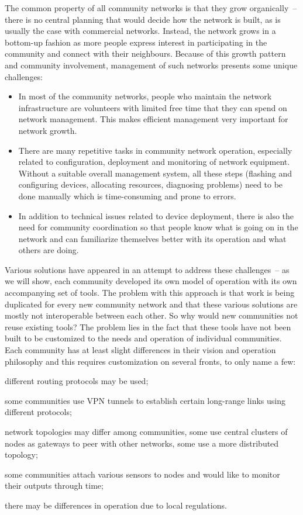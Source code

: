\documentclass[5p,sort&compress]{elsarticle}
\begin{document}
The common property of all community networks is that they grow organically~-- there is no central planning that would decide how the network is built, as is usually the case with commercial networks.
Instead, the network grows in a bottom-up fashion as more people express interest in participating in the community and connect with their neighbours.
Because of this growth pattern and community involvement, management of such networks presents some unique challenges:

\begin{itemize}
\item In most of the community networks, people who maintain the network infrastructure are volunteers with limited free time that they can spend on network management.
This makes efficient management very important for network growth.

\item There are many repetitive tasks in community network operation, especially related to configuration, deployment and monitoring of network equipment.
Without a suitable overall management system, all these steps (flashing and configuring devices, allocating resources, diagnosing problems) need to be done manually which is time-consuming and prone to errors.

\item In addition to technical issues related to device deployment, there is also the need for community coordination so that people know what is going on in the network and can familiarize themselves better with its operation and what others are doing.
\end{itemize}

Various solutions have appeared in an attempt to address these challenges~-- as we will show, each community developed its own model of operation with its own accompanying set of tools.
The problem with this approach is that work is being duplicated for every new community network and that these various solutions are mostly not interoperable between each other.
So why would new communities not reuse existing tools?
The problem lies in the fact that these tools have not been built to be customized to the needs and operation of individual communities.
Each community has at least slight differences in their vision and operation philosophy and this requires customization on several fronts, to only name a few:
\begin{enumerate*}[label=\itshape\alph*\upshape)]
\item different routing protocols may be used;
\item some communities use VPN tunnels to establish certain long-range links using different protocols;
\item network topologies may differ among communities, some use central clusters of nodes as gateways to peer with other networks, some use a more distributed topology;
\item some communities attach various sensors to nodes and would like to monitor their outputs through time;
\item there may be differences in operation due to local regulations.
\end{enumerate*}
\end{document}
